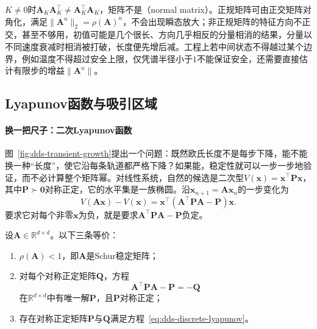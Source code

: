 $K\neq0$时$\bm A_K\bm A_K^{\top}\neq\bm A_K^{\top}\bm A_K$，矩阵不是（normal matrix）。正规矩阵可由正交矩阵对角化，满足$\lVert\bm A^n\rVert_2=\rho(\bm A)^n$，不会出现瞬态放大；非正规矩阵的特征方向不正交，甚至不够用，初值可能是几个很长、方向几乎相反的分量相消的结果，分量以不同速度衰减时相消被打破，长度便先增后减。工程上若中间状态不得越过某个边界，例如温度不得超过安全上限，仅凭谱半径小于$1$不能保证安全，还需要直接估计有限步的增益$\lVert\bm A^n\rVert$。

\subsection{Lyapunov函数与吸引区域}
\label{sec:dds-lyapunov}

\paragraph{换一把尺子：二次Lyapunov函数}
图~\ref{fig:dds-transient-growth}提出一个问题：既然欧氏长度不是每步下降，能不能换一种“长度”，使它沿每条轨道都严格下降？如果能，稳定性就可以一步一步地验证，而不必计算整个矩阵幂。对线性系统，自然的候选是二次型$V(\bm x)=\bm x^{\top}\bm P\bm x$，其中$\bm P\succ\bm0$对称正定，它的水平集是一族椭圆。沿$\bm x_{n+1}=\bm A\bm x_n$的一步变化为
\[
  V(\bm A\bm x)-V(\bm x)=\bm x^{\top}(\bm A^{\top}\bm P\bm A-\bm P)\bm x .
\]
要求它对每个非零$\bm x$为负，就是要求$\bm A^{\top}\bm P\bm A-\bm P$负定。

\begin{theorem}[离散Lyapunov方程]
\label{thm:dynamical-discrete-lyapunov-equation}
\label{thm:dds-discrete-lyapunov-equation}
设$\bm A\in\mathbb R^{d\times d}$。以下三条等价：
\begin{enumerate}
  \item $\rho(\bm A)<1$，即$\bm A$是Schur稳定矩阵；
  \item 对每个对称正定矩阵$\bm Q$，方程
  \begin{equation}
    \bm A^{\top}\bm P\bm A-\bm P=-\bm Q
    \label{eq:dds-discrete-lyapunov}
  \end{equation}
  在$\mathbb R^{d\times d}$中有唯一解$\bm P$，且$\bm P$对称正定；
  \item 存在对称正定矩阵$\bm P$与$\bm Q$满足方程~\eqref{eq:dds-discrete-lyapunov}。
\end{enumerate}
\end{theorem}

